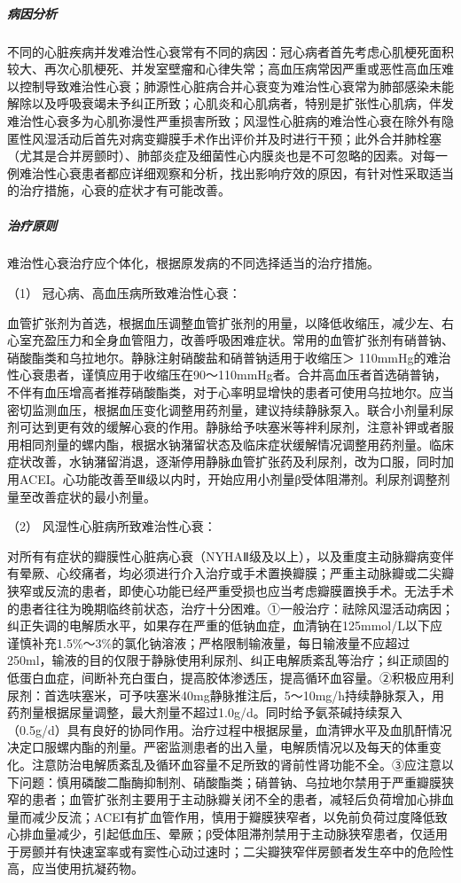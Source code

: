 \subparagraph{病因分析}

不同的心脏疾病并发难治性心衰常有不同的病因：冠心病者首先考虑心肌梗死面积较大、再次心肌梗死、并发室壁瘤和心律失常；高血压病常因严重或恶性高血压难以控制导致难治性心衰；肺源性心脏病合并心衰变为难治性心衰常为肺部感染未能解除以及呼吸衰竭未予纠正所致；心肌炎和心肌病者，特别是扩张性心肌病，伴发难治性心衰多为心肌弥漫性严重损害所致；风湿性心脏病的难治性心衰在除外有隐匿性风湿活动后首先对病变瓣膜手术作出评价并及时进行干预；此外合并肺栓塞（尤其是合并房颤时）、肺部炎症及细菌性心内膜炎也是不可忽略的因素。对每一例难治性心衰患者都应详细观察和分析，找出影响疗效的原因，有针对性采取适当的治疗措施，心衰的症状才有可能改善。

\subparagraph{治疗原则}

难治性心衰治疗应个体化，根据原发病的不同选择适当的治疗措施。

\hypertarget{text00074.htmlux5cux23CHP3-3-3-4-2-4-1}{}
（1） 冠心病、高血压病所致难治性心衰：

血管扩张剂为首选，根据血压调整血管扩张剂的用量，以降低收缩压，减少左、右心室充盈压力和全身血管阻力，改善呼吸困难症状。常用的血管扩张剂有硝普钠、硝酸酯类和乌拉地尔。静脉注射硝酸盐和硝普钠适用于收缩压＞
110mmHg的难治性心衰患者，谨慎应用于收缩压在90～110mmHg者。合并高血压者首选硝普钠，不伴有血压增高者推荐硝酸酯类，对于心率明显增快的患者可使用乌拉地尔。应当密切监测血压，根据血压变化调整用药剂量，建议持续静脉泵入。联合小剂量利尿剂可达到更有效的缓解心衰的作用。静脉给予呋塞米等袢利尿剂，注意补钾或者服用相同剂量的螺内酯，根据水钠潴留状态及临床症状缓解情况调整用药剂量。临床症状改善，水钠潴留消退，逐渐停用静脉血管扩张药及利尿剂，改为口服，同时加用ACEI。心功能改善至Ⅲ级以内时，开始应用小剂量β受体阻滞剂。利尿剂调整剂量至改善症状的最小剂量。

\hypertarget{text00074.htmlux5cux23CHP3-3-3-4-2-4-2}{}
（2） 风湿性心脏病所致难治性心衰：

对所有有症状的瓣膜性心脏病心衰（NYHAⅡ级及以上），以及重度主动脉瓣病变伴有晕厥、心绞痛者，均必须进行介入治疗或手术置换瓣膜；严重主动脉瓣或二尖瓣狭窄或反流的患者，即使心功能已经严重受损也应当考虑瓣膜置换手术。无法手术的患者往往为晚期临终前状态，治疗十分困难。①一般治疗：祛除风湿活动病因；纠正失调的电解质水平，如果存在严重的低钠血症，血清钠在125mmol/L以下应谨慎补充1.5\%～3\%的氯化钠溶液；严格限制输液量，每日输液量不应超过250ml，输液的目的仅限于静脉使用利尿剂、纠正电解质紊乱等治疗；纠正顽固的低蛋白血症，间断补充白蛋白，提高胶体渗透压，提高循环血容量。②积极应用利尿剂：首选呋塞米，可予呋塞米40mg静脉推注后，5～10mg/h持续静脉泵入，用药剂量根据尿量调整，最大剂量不超过1.0g/d。同时给予氨茶碱持续泵入（0.5g/d）具有良好的协同作用。治疗过程中根据尿量，血清钾水平及血肌酐情况决定口服螺内酯的剂量。严密监测患者的出入量，电解质情况以及每天的体重变化。注意防治电解质紊乱及循环血容量不足所致的肾前性肾功能不全。③应注意以下问题：慎用磷酸二酯酶抑制剂、硝酸酯类；硝普钠、乌拉地尔禁用于严重瓣膜狭窄的患者；血管扩张剂主要用于主动脉瓣关闭不全的患者，减轻后负荷增加心排血量而减少反流；ACEI有扩血管作用，慎用于瓣膜狭窄者，以免前负荷过度降低致心排血量减少，引起低血压、晕厥；β受体阻滞剂禁用于主动脉狭窄患者，仅适用于房颤并有快速室率或有窦性心动过速时；二尖瓣狭窄伴房颤者发生卒中的危险性高，应当使用抗凝药物。

